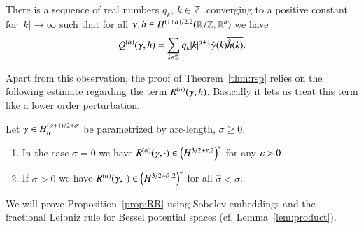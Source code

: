 \begin{proposition} \label{prop:formOfQ}
 There is a sequence of real numbers $q_k$, $k \in \mathbb Z$, converging to a positive constant
 for $|k| \rightarrow \infty$
 such that for all $\gamma, h \in\W[\br{1+\alpha}/2 ,2](\mathbb R / \mathbb Z, \mathbb R^n)$
 we have
 \begin{equation} \label{eq:formOfQ}
  \Q(\gamma, h ) = \sum_{k\in \mathbb Z} q_k |k|^{\alpha +1}  \hat \gamma(k) \overline{\hat h (k)}.
 \end{equation}
\end{proposition}


Apart from this observation, the proof of Theorem~\ref{thm:rsp}  relies on the following estimate regarding the 
term $\RR(\gamma,h)$. Basically it lets us treat this term like a lower order perturbation.

\begin{proposition}\label{prop:RR}
 Let $\g\in\Wir[(\a+1)/2+\sigma]$ be parametrized by arc-length, $\sigma \geq 0$.
 \begin{enumerate}
  \item In the case $\sigma = 0$ we have $\RR(\gamma, \cdot)\in\br{H^{3/2+\eps ,2}}^*$ for any $\eps>0$.
  \item If $\sigma >0 $ we have $\RR(\gamma, \cdot)\in\br{H^{3/2- \hat \sigma,2}}^*$
  for all $\hat \sigma < \sigma$.	
 \end{enumerate}
\end{proposition}

We will prove  Proposition~\ref{prop:RR} using Sobolev embeddings and the fractional Leibniz rule 
for Bessel potential spaces (cf. Lemma~\ref{lem:product}).

